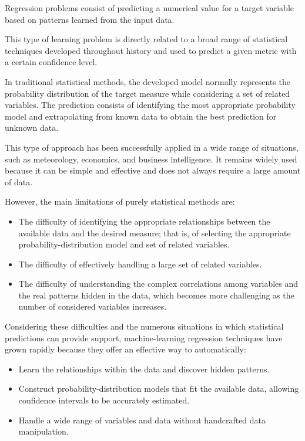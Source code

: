 Regression problems consist of predicting a numerical value for a target variable based on patterns learned from the input data.

This type of learning problem is directly related to a broad range of statistical techniques developed throughout history and used to predict a given metric with a certain confidence level.

In traditional statistical methods, the developed model normally represents the probability distribution of the target measure while considering a set of related variables. The prediction consists of identifying the most appropriate probability model and extrapolating from known data to obtain the best prediction for unknown data.

This type of approach has been successfully applied in a wide range of situations, such as meteorology, economics, and business intelligence. It remains widely used because it can be simple and effective and does not always require a large amount of data.

However, the main limitations of purely statistical methods are:
\begin{itemize}
    \item The difficulty of identifying the appropriate relationships between the available data and the desired measure; that is, of selecting the appropriate probability-distribution model and set of related variables.
    \item The difficulty of effectively handling a large set of related variables.
    \item The difficulty of understanding the complex correlations among variables and the real patterns hidden in the data, which becomes more challenging as the number of considered variables increases.
\end{itemize}

Considering these difficulties and the numerous situations in which statistical predictions can provide support, machine-learning regression techniques have grown rapidly because they offer an effective way to automatically:

\begin{itemize}
    \item Learn the relationships within the data and discover hidden patterns.
    \item Construct probability-distribution models that fit the available data, allowing confidence intervals to be accurately estimated.
    \item Handle a wide range of variables and data without handcrafted data manipulation.
\end{itemize}

